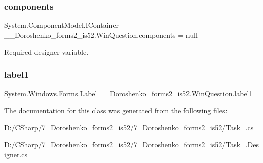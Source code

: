 \hypertarget{class__7___doroshenko__forms2__is52_1_1_win_question_ad8b2952aae1000f120f3aaa8ab63697f}{}\label{class__7___doroshenko__forms2__is52_1_1_win_question_ad8b2952aae1000f120f3aaa8ab63697f} 
\subsubsection{\texorpdfstring{components}{components}}
{\footnotesize\ttfamily System.\+Component\+Model.\+I\+Container \+\_\+\_\+\+Doroshenko\+\_\+forms2\+\_\+is52.\+Win\+Question.\+components = null\hspace{0.3cm}{\ttfamily [private]}}



Required designer variable. 

\hypertarget{class__7___doroshenko__forms2__is52_1_1_win_question_ac84f9387bd3683c5a3ac30ff987eaba1}{}\label{class__7___doroshenko__forms2__is52_1_1_win_question_ac84f9387bd3683c5a3ac30ff987eaba1} 
\subsubsection{\texorpdfstring{label1}{label1}}
{\footnotesize\ttfamily System.\+Windows.\+Forms.\+Label \+\_\+\_\+\+Doroshenko\+\_\+forms2\+\_\+is52.\+Win\+Question.\+label1\hspace{0.3cm}{\ttfamily [private]}}



The documentation for this class was generated from the following files\+:\begin{DoxyCompactItemize}
\item 
D\+:/\+C\+Sharp/7\+\_\+\+Doroshenko\+\_\+forms2\+\_\+is52/7\+\_\+\+Doroshenko\+\_\+forms2\+\_\+is52/\hyperlink{_task__1_8cs}{Task\+\_.\+cs}\item 
D\+:/\+C\+Sharp/7\+\_\+\+Doroshenko\+\_\+forms2\+\_\+is52/7\+\_\+\+Doroshenko\+\_\+forms2\+\_\+is52/\hyperlink{_task__1_8_designer_8cs}{Task\+\_.\+Designer.\+cs}\end{DoxyCompactItemize}
